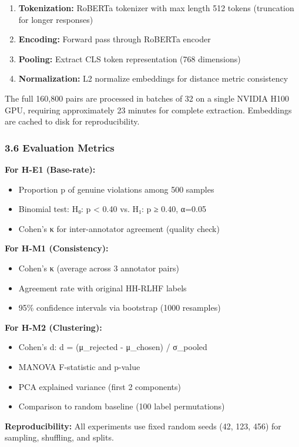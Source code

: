 \begin{enumerate}
\item \textbf{Tokenization:} RoBERTa tokenizer with max length 512 tokens (truncation for longer responses)
\item \textbf{Encoding:} Forward pass through RoBERTa encoder
\item \textbf{Pooling:} Extract CLS token representation (768 dimensions)
\item \textbf{Normalization:} L2 normalize embeddings for distance metric consistency
\end{enumerate}

The full 160,800 pairs are processed in batches of 32 on a single NVIDIA H100 GPU, requiring approximately 23 minutes for complete extraction. Embeddings are cached to disk for reproducibility.

\subsubsection{3.6 Evaluation Metrics}

\textbf{For H-E1 (Base-rate):}
\begin{itemize}
\item Proportion p of genuine violations among 500 samples
\item Binomial test: H₀: p < 0.40 vs. H₁: p ≥ 0.40, α=0.05
\item Cohen's κ for inter-annotator agreement (quality check)
\end{itemize}

\textbf{For H-M1 (Consistency):}
\begin{itemize}
\item Cohen's κ (average across 3 annotator pairs)
\item Agreement rate with original HH-RLHF labels
\item 95\% confidence intervals via bootstrap (1000 resamples)
\end{itemize}

\textbf{For H-M2 (Clustering):}
\begin{itemize}
\item Cohen's d: d = (μ_rejected - μ_chosen) / σ_pooled
\item MANOVA F-statistic and p-value
\item PCA explained variance (first 2 components)
\item Comparison to random baseline (100 label permutations)
\end{itemize}

\textbf{Reproducibility:} All experiments use fixed random seeds (42, 123, 456) for sampling, shuffling, and splits.
